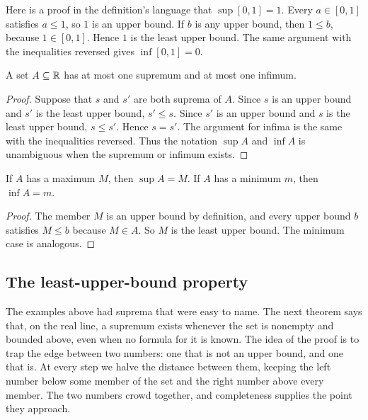 Here is a proof in the definition's language that $\sup [0,1]=1$. Every $a\in[0,1]$ satisfies $a\le1$, so $1$ is an upper bound. If $b$ is any upper bound, then $1\le b$, because $1\in[0,1]$. Hence $1$ is the least upper bound. The same argument with the inequalities reversed gives $\inf [0,1]=0$.

\par\noindent\begin{minipage}{\linewidth}
\begin{proposition}\label{ch11:prop:sup-unique}
A set $A\subseteq\mathbb R$ has at most one supremum and at most one infimum.
\end{proposition}
\end{minipage}\par

\begin{proof}
Suppose that $s$ and $s'$ are both suprema of $A$. Since $s$ is an upper bound and $s'$ is the least upper bound, $s'\le s$. Since $s'$ is an upper bound and $s$ is the least upper bound, $s\le s'$. Hence $s=s'$. The argument for infima is the same with the inequalities reversed. Thus the notation $\sup A$ and $\inf A$ is unambiguous when the supremum or infimum exists.
\end{proof}

\par\noindent\begin{minipage}{\linewidth}
\begin{proposition}\label{ch11:prop:max-sup}
If $A$ has a maximum $M$, then $\sup A=M$. If $A$ has a minimum $m$, then $\inf A=m$.
\end{proposition}
\end{minipage}\par

\begin{proof}
The member $M$ is an upper bound by definition, and every upper bound $b$ satisfies $M\le b$ because $M\in A$. So $M$ is the least upper bound. The minimum case is analogous.
\end{proof}


\subsection*{The least-upper-bound property}
The examples above had suprema that were easy to name. The next theorem says that, on the real line, a supremum exists whenever the set is nonempty and bounded above, even when no formula for it is known. The idea of the proof is to trap the edge between two numbers: one that is not an upper bound, and one that is. At every step we halve the distance between them, keeping the left number below some member of the set and the right number above every member. The two numbers crowd together, and completeness supplies the point they approach.

